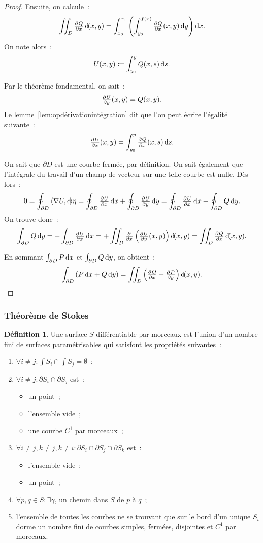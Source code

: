\documentclass{article}
\newcommand{\scpr}[2]{{\left\langle#1, #2\right\rangle}}
\theoremstyle{definition}
\newtheorem{déf}[thm]{Définition}
\theoremstyle{remark}
\begin{document}
\begin{proof}
		Ensuite, on calcule~:
		\[\iint_D\pd Qx\dif (x, y) = \int_{x_0}^{x_1}\left(\int_{y_0}^{f(x)}\pd Qx(x, y)\dif y\right)\dif x.\]
		On note alors~:
		\[U(x, y) \coloneqq \int_{y_0}^yQ(x, s)\dif s.\]

		Par le théorème fondamental, on sait~:
		\[\pd Uy(x, y) = Q(x, y).\]
		Le lemme~\ref{lem:opdérivationintégration} dit que l'on peut écrire l'égalité suivante~:
		\[\pd Ux(x, y) = \int_{y_0}^y\pd Qx(x, s)\dif s.\]

		On sait que $\partial D$ est une courbe fermée, par définition. On sait également que l'intégrale du travail d'un champ de vecteur sur une telle courbe
		est nulle. Dès lors~:
		\[0 = \oint_{\partial D}\scpr {\nabla U}\dif\eta = \oint_{\partial D}\pd Ux\dif x + \oint_{\partial D}\pd Uy\dif y
		= \oint_{\partial D}\pd Ux\dif x + \oint_{\partial D}Q\dif y.\]
		On trouve donc~:
		\[\int_{\partial D}Q\dif y = -\int_{\partial D}\pd Ux\dif x = +\iint_D\pd {}x\left(\pd Uy(x, y)\right)\dif (x, y)
		= \iint_D\pd Qx\dif (x, y).\]

		En sommant $\int_{\partial D}P\dif x$ et $\int_{\partial D}Q\dif y$, on obtient~:
		\[\int_{\partial D}\left(P\dif x + Q\dif y\right) = \iint_D\left(\pd Qx - \pd Py\right)\dif (x, y).\]
		\end{proof}

		\subsubsection{Théorème de Stokes}
		\begin{déf} Une surface $S$ différentiable par morceaux est l'union d'un nombre fini de surfaces paramétrisables qui satisfont les propriétés suivantes~:
		\begin{enumerate}
			\item $\forall i \neq j : \int S_i \cap \int S_j = \emptyset$~;
			\item $\forall i \neq j : \partial S_i \cap \partial S_j$ est~:
			\begin{itemize}
				\item un point~;
				\item l'ensemble vide~;
				\item une courbe $C^1$ par morceaux~;
			\end{itemize}
			\item $\forall i \neq j, k \neq j, k \neq i : \partial S_i \cap \partial S_j \cap \partial S_k$ est~:
			\begin{itemize}
				\item l'ensemble vide~;
				\item un point~;
			\end{itemize}
			\item $\forall p, q \in S : \exists \gamma$, un chemin dans $S$ de $p$ à $q$~;
			\item l'ensemble de toutes les courbes ne se trouvant que sur le bord d'un unique $S_i$ dorme un nombre fini de courbes simples, fermées, disjointes
			et $C^1$ par morceaux.
		\end{enumerate}
		\end{déf}
\end{document}
